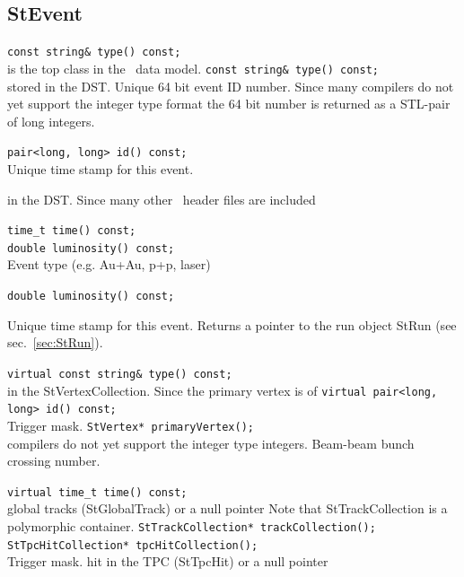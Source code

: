 %
\subsection{StEvent}
\label{sec:StEvent}
    \verb+const string& type() const;+\\
     is the top class in the \StEvent\ data model.
    \verb+const string& type() const;+\\ 
    stored in the DST.
    Unique 64 bit event ID number. Since many
    compilers do not yet support the 
    integer type format the 64 bit number is returned
    as a STL-pair of long integers. 

    \verb+pair<long, long> id() const;+\\
    Unique time stamp for this event.
    
    in the DST. Since many other \StEvent\ header files are included
    
    \verb+time_t time() const;+\\
    \verb+double luminosity() const;+\\
    
    Event type (e.g. Au+Au, p+p, laser)

    

    \verb+double luminosity() const;+\\      
    
\item[Public\\ Constructors]
     Unique time stamp for this event.
    Returns a pointer to the run object StRun (see sec.~\ref{sec:StRun}).
    
    \verb+virtual const string& type() const;+\\
    
    in the StVertexCollection. Since the primary vertex is of
    \verb+virtual pair<long, long> id() const;+\\
    Trigger mask.
    \verb+StVertex* primaryVertex();+\\
    compilers do not yet support the  integer type
    integers. 
    Beam-beam bunch crossing number.
    
    \verb+virtual time_t time() const;+\\

    
    global tracks (StGlobalTrack) or a null pointer
    Note that StTrackCollection is a polymorphic container.
    \verb+StTrackCollection* trackCollection();+\\
    \verb+StTpcHitCollection* tpcHitCollection();+\\
    Trigger mask.
    hit in the TPC (StTpcHit) or a null pointer

